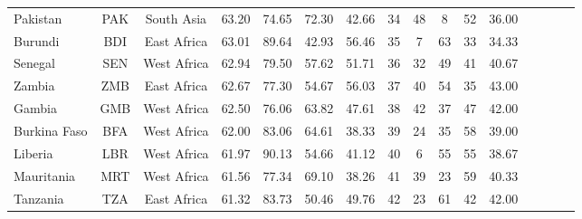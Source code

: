 \begin{singlespace}
{\begin{longtable}[H]{lccccccccccccccc}
Pakistan                          & PAK           & South Asia         & 63.20       & 74.65            & 72.30                     & 42.66           & 34             & 48                  & 8                            & 52                 & 36.00                  \\
Burundi                           & BDI           & East Africa        & 63.01       & 89.64            & 42.93                     & 56.46           & 35             & 7                   & 63                           & 33                 & 34.33                  \\
Senegal                           & SEN           & West Africa        & 62.94       & 79.50            & 57.62                     & 51.71           & 36             & 32                  & 49                           & 41                 & 40.67                  \\
Zambia                            & ZMB           & East Africa        & 62.67       & 77.30            & 54.67                     & 56.03           & 37             & 40                  & 54                           & 35                 & 43.00                  \\
Gambia                            & GMB           & West Africa        & 62.50       & 76.06            & 63.82                     & 47.61           & 38             & 42                  & 37                           & 47                 & 42.00                  \\
Burkina Faso                      & BFA           & West Africa        & 62.00       & 83.06            & 64.61                     & 38.33           & 39             & 24                  & 35                           & 58                 & 39.00                  \\
Liberia                           & LBR           & West Africa        & 61.97       & 90.13            & 54.66                     & 41.12           & 40             & 6                   & 55                           & 55                 & 38.67                  \\
Mauritania                        & MRT           & West Africa        & 61.56       & 77.34            & 69.10                     & 38.26           & 41             & 39                  & 23                           & 59                 & 40.33                  \\
Tanzania      & TZA           & East Africa        & 61.32       & 83.73            & 50.46                     & 49.76           & 42             & 23                  & 61                           & 42                 & 42.00                  \\

\end{longtable}}
\end{singlespace}
